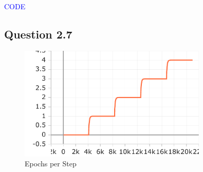 \documentclass{article}
\begin{document}
\textcolor{blue}{CODE}

\subsection*{Question 2.7}

\begin{figure}[H]
    \centering
    \includegraphics[width=0.8\textwidth]{images/epoch.pdf}
    \caption{Epochs per Step}
    \label{fig:loss_epochs}
\end{figure}

\end{document}
